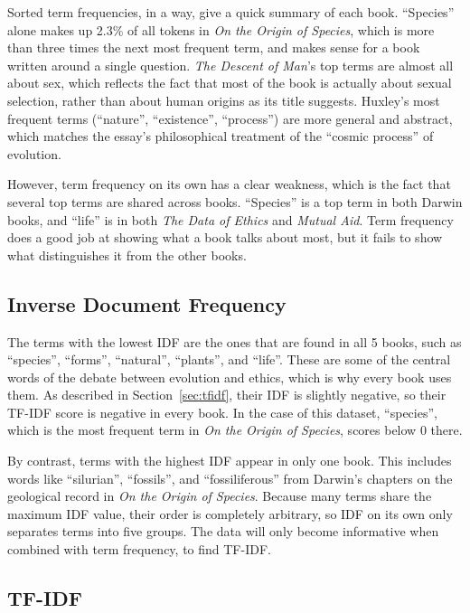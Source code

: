\documentclass[11pt]{article}
\begin{document}
Sorted term frequencies, in a way, give a quick summary of each book.
``Species'' alone makes up 2.3\% of all tokens in \emph{On the Origin of Species}, which is more than three times the next most frequent term, and makes sense for a book written around a single question.
\emph{The Descent of Man}'s top terms are almost all about sex, which reflects the fact that most of the book is actually about sexual selection, rather than about human origins as its title suggests.
Huxley's most frequent terms (``nature'', ``existence'', ``process'') are more general and abstract, which matches the essay's philosophical treatment of the ``cosmic process'' of evolution.

However, term frequency on its own has a clear weakness, which is the fact that several top terms are shared across books.
``Species'' is a top term in both Darwin books, and ``life'' is in both \emph{The Data of Ethics} and \emph{Mutual Aid}.
Term frequency does a good job at showing what a book talks about most, but it fails to show what distinguishes it from the other books.

\subsection{Inverse Document Frequency}
\label{sec:results-idf}

The terms with the lowest IDF are the ones that are found in all 5 books, such as ``species'', ``forms'', ``natural'', ``plants'', and ``life''.
These are some of the central words of the debate between evolution and ethics, which is why every book uses them.
As described in Section~\ref{sec:tfidf}, their IDF is slightly negative, so their TF-IDF score is negative in every book.
In the case of this dataset, ``species'', which is the most frequent term in \emph{On the Origin of Species}, scores below 0 there.

By contrast, terms with the highest IDF appear in only one book.
This includes words like ``silurian'', ``fossils'', and ``fossiliferous'' from Darwin's chapters on the geological record in \emph{On the Origin of Species}.
Because many terms share the maximum IDF value, their order is completely arbitrary, so IDF on its own only separates terms into five groups.
The data will only become informative when combined with term frequency, to find TF-IDF.

\subsection{TF-IDF}
\end{document}
